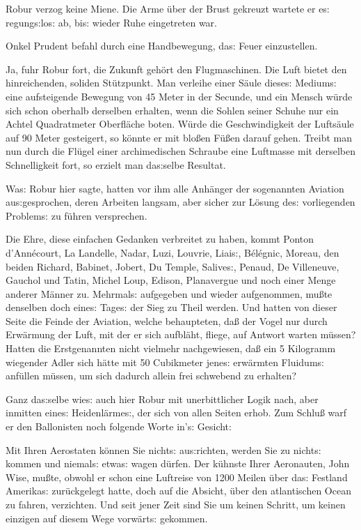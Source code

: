 \documentclass[oneside,12pt]{book}
\newcommand{\s}{s:}
\begin{document}
Robur verzog keine Miene. Die Arme \"uber der Brust gekreuzt wartete
er e{\s} regung{\s}lo{\s} ab, bi{\s} wieder Ruhe eingetreten war.

Onkel Prudent befahl durch eine Handbewegung, da{\s} Feuer
einzustellen.

{\glqq}Ja, fuhr Robur fort, die Zukunft geh\"ort den Flugmaschinen.
Die Luft bietet den hinreichenden, soliden St\"utzpunkt. Man verleihe
einer S\"aule diese{\s} Medium{\s} eine aufsteigende Bewegung von 45
Meter in der Secunde, und ein Mensch w\"urde sich schon oberhalb
derselben erhalten, wenn die Sohlen seiner Schuhe nur ein Achtel
Quadratmeter Oberfl\"ache boten. W\"urde die Geschwindigkeit der
Lufts\"aule auf 90 Meter gesteigert, so k\"onnte er mit blo{\ss}en
F\"u{\ss}en darauf gehen. Treibt man nun durch die Fl\"ugel einer
archimedischen Schraube eine Luftmasse mit derselben Schnelligkeit
fort, so erzielt man da{\s}selbe Resultat.{\grqq}

Wa{\s} Robur hier sagte, hatten vor ihm alle Anh\"anger der
sogenannten Aviation au{\s}gesprochen, deren Arbeiten langsam, aber
sicher zur L\"osung de{\s} vorliegenden Problem{\s} zu f\"uhren
versprechen.

Die Ehre, diese einfachen Gedanken verbreitet zu haben, kommt Ponton
d'Ann\'ecourt, La Landelle, Nadar, Luzi, Louvrie, Liai{\s},
B\'el\'egnic, Moreau, den beiden Richard, Babinet, Jobert, Du Temple,
Salive{\s}, Penaud, De Villeneuve, Gauchol und Tatin, Michel Loup,
Edison, Planavergue und noch einer Menge anderer M\"anner zu.
Mehrmal{\s} aufgegeben und wieder aufgenommen, mu{\ss}te denselben
doch eine{\s} Tage{\s} der Sieg zu Theil werden. Und hatten von
dieser Seite die Feinde der Aviation, welche behaupteten, da{\ss} der
Vogel nur durch Erw\"armung der Luft, mit der er sich aufbl\"aht,
fliege, auf Antwort warten m\"ussen? Hatten die Erstgenannten nicht
vielmehr nachgewiesen, da{\ss} ein 5 Kilogramm wiegender Adler sich
h\"atte mit 50 Cubikmeter jene{\s} erw\"armten Fluidum{\s} anf\"ullen
m\"ussen, um sich dadurch allein frei schwebend zu erhalten?

Ganz da{\s}selbe wie{\s} auch hier Robur mit unerbittlicher Logik
nach, aber inmitten eine{\s} Heidenl\"arme{\s}, der sich von allen
Seiten erhob. Zum Schlu{\ss} warf er den Ballonisten noch folgende
Worte in'{\s} Gesicht:

{\glqq}Mit Ihren Aerostaten k\"onnen Sie nicht{\s} au{\s}richten,
werden Sie zu nicht{\s} kommen und niemal{\s} etwa{\s} wagen
d\"urfen. Der k\"uhnste Ihrer Aeronauten, John Wise, mu{\ss}te,
obwohl er schon eine Luftreise von 1200 Meilen \"uber da{\s} Festland
Amerika{\s} zur\"uckgelegt hatte, doch auf die Absicht, \"uber den
atlantischen Ocean zu fahren, verzichten. Und seit jener Zeit sind
Sie um keinen Schritt, um keinen einzigen auf diesem Wege
vorw\"art{\s} gekommen.
\end{document}
